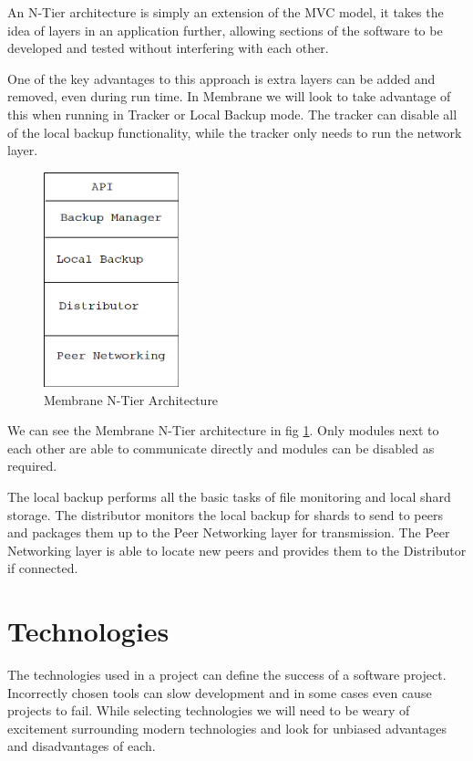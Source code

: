 \documentclass[11pt, a4paper, twocolumn, twoside]{report}
\begin{document}
An N-Tier architecture is simply an extension of the MVC model, it takes the idea of layers in an application further, allowing sections of the software to be developed and tested without interfering with each other.

One of the key advantages to this approach is extra layers can be added and removed, even during run time. In Membrane we will look to take advantage of this when running in Tracker or Local Backup mode. The tracker can disable all of the local backup functionality, while the tracker only needs to run the network layer.

\begin{figure}[b!]
 \centering
 \includegraphics[width=0.35\textwidth]{membrane-n-tier}
 \caption{Membrane N-Tier Architecture}
 \label{fig:membrane-n-tier}
\end{figure}

We can see the Membrane N-Tier architecture in fig \ref{fig:membrane-n-tier}. Only modules next to each other are able to communicate directly and modules can be disabled as required.

The local backup performs all the basic tasks of file monitoring and local shard storage. The distributor monitors the local backup for shards to send to peers and packages them up to the Peer Networking layer for transmission. The Peer Networking layer is able to locate new peers and provides them to the Distributor if connected.

\section{Technologies}

The technologies used in a project can define the success of a software project. Incorrectly chosen tools can slow development and in some cases even cause projects to fail. While selecting technologies we will need to be weary of excitement surrounding modern technologies and look for unbiased advantages and disadvantages of each.
\end{document}
